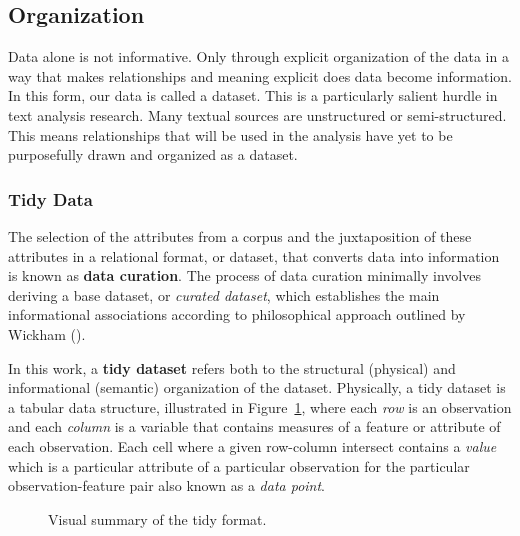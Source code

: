 \documentclass[
  letterpaper,
  DIV=11,
  numbers=noendperiod]{scrreprt}
\theoremstyle{definition}
\theoremstyle{remark}
\begin{document}
\subsection{Organization}\label{sec-ud-organization}

Data alone is not informative. Only through explicit organization of the
data in a way that makes relationships and meaning explicit does data
become information. In this form, our data is called a dataset. This is
a particularly salient hurdle in text analysis research. Many textual
sources are unstructured or semi-structured. This means relationships
that will be used in the analysis have yet to be purposefully drawn and
organized as a dataset.

\subsubsection{Tidy Data}\label{sec-ud-tidy-data}

The selection of the attributes from a corpus and the juxtaposition of
these attributes in a relational format, or dataset, that converts data
into information is known as \textbf{data curation}. The process of data
curation minimally involves deriving a base dataset, or \emph{curated
dataset}, which establishes the main informational associations
according to philosophical approach outlined by Wickham
().

In this work, a \textbf{tidy dataset} refers both to the structural
(physical) and informational (semantic) organization of the dataset.
Physically, a tidy dataset is a tabular data structure, illustrated in
Figure~\ref{fig-ud-tidy-format-image}, where each \emph{row} is an
observation and each \emph{column} is a variable that contains measures
of a feature or attribute of each observation. Each cell where a given
row-column intersect contains a \emph{value} which is a particular
attribute of a particular observation for the particular
observation-feature pair also known as a \emph{data point}.

\begin{figure}[H]


\caption{\label{fig-ud-tidy-format-image}Visual summary of the tidy
format.}

\end{figure}%
\end{document}
